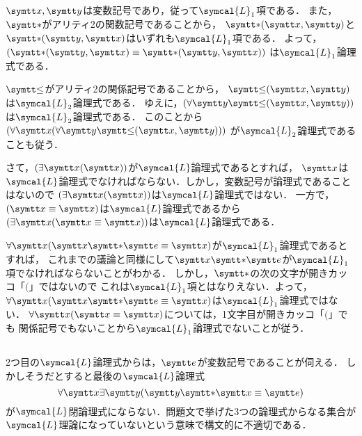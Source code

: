 \subsection*{}

\(\obj{x}, \obj{y}\)は変数記号であり，従って\(\symcal{L}_1\)項である．
また，\(\obj{\ast}\)がアリティ2の関数記号であることから，
\(\apply{\mathord{\obj{\ast}}}{\obj{x}, \obj{y}}\)と
\(\apply{\mathord{\obj{\ast}}}{\obj{y}, \obj{x}}\)はいずれも\(\symcal{L}_1\)項である．
よって，
\(\paren{\apply{\mathord{\obj{\ast}}}{\obj{y}, \obj{x}} \objeq \apply{\mathord{\obj{\ast}}}{\obj{y}, \obj{x}}}\)
は\(\symcal{L}_1\)論理式である．

\(\obj{\leq}\)がアリティ2の関係記号であることから，
\(\apply{\mathord{\obj{\leq}}}{\obj{x}, \obj{y}}\)は\(\symcal{L}_2\)論理式である．
ゆえに，\(\paren{\forall \obj{y}\apply{\mathord{\obj{\leq}}}{\obj{x}, \obj{y}}}\)
は\(\symcal{L}_2\)論理式である．
このことから\(\paren{\forall \obj{x}\paren{\forall \obj{y}\apply{\mathord{\obj{\leq}}}{\obj{x}, \obj{y}}}}\)
が\(\symcal{L}_2\)論理式であることも従う．

さて，\(\paren{\apply{\exists \obj{x}}{\obj{x}}}\)が\(\symcal{L}\)論理式であるとすれば，
\(\obj{x}\)は\(\symcal{L}\)論理式でなければならない．しかし，変数記号が論理式であることはないので
\(\paren{\apply{\exists \obj{x}}{\obj{x}}}\)は\(\symcal{L}\)論理式ではない．
一方で，\(\paren{\obj{x} \objeq \obj{x}}\)は\(\symcal{L}\)論理式であるから
\(\paren{\apply{\exists \obj{x}}{\obj{x} \objeq \obj{x}}}\)は\(\symcal{L}\)論理式である．

\(\apply{\forall \obj{x}}{\obj{x} \obj{\ast} \obj{e} \objeq \obj{x}}\)が\(\symcal{L}_1\)論理式であるとすれば，
これまでの議論と同様にして\(\obj{x} \obj{\ast} \obj{e}\)が\(\symcal{L}_1\)項でなければならないことがわかる．
しかし，\(\obj{\ast}\)の次の文字が開きカッコ「\(\lparen\)」ではないので
これは\(\symcal{L}_1\)項とはなりえない．よって，
\(\apply{\forall \obj{x}}{\obj{x} \obj{\ast} \obj{e} \objeq \obj{x}}\)は\(\symcal{L}_1\)論理式ではない．
\(\apply{\forall \obj{x}}{\obj{x} \objeq \obj{x}}\)については，1文字目が開きカッコ「\(\lparen\)」でも
関係記号でもないことから\(\symcal{L}_1\)論理式でないことが従う．

\subsection*{}

2つ目の\(\symcal{L}\)論理式からは，\(\obj{e}\)が変数記号であることが伺える．
しかしそうだとすると最後の\(\symcal{L}\)論理式
\[
	\forall \obj{x} \exists \obj{y} \paren{\obj{y} \obj{\ast} \obj{x} \objeq \obj{e}}
\]
が\(\symcal{L}\)閉論理式にならない．問題文で挙げた3つの論理式からなる集合が
\(\symcal{L}\)理論になっていないという意味で構文的に不適切である．

